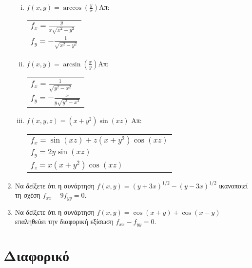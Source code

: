 \documentclass[a4paper,table]{report}
\begin{document}
\begin{enumerate}
\begin{enumerate}[i)]
      \item $f(x,y)=\arccos(\frac{y}{x})$\hfill Απ: \begin{tabular}{l}
          $f_x=\frac{y}{x\sqrt{x^2-y^2}}$ \\ 
          $f_y=-\frac{1}{\sqrt{x^2-y^2}}$
        \end{tabular}

      \item $f(x,y)=\arcsin(\frac{x}{y})$\hfill Απ: \begin{tabular}{l}
          $f_x=\frac{1}{\sqrt{y^2-x^2}}$ \\ 
          $f_y=-\frac{x}{y\sqrt{y^2-x^2}}$
        \end{tabular}

      \item $ f(x,y,z) = (x+y^{2}) \sin{(xz)} $ \hfill Απ: \begin{tabular}{l}
          $ f_{x} = \sin{(xz)} + z(x+y^{2}) \cos{(xz)} $ \\
          $ f_{y} = 2y \sin{(xz)} $ \\
          $ f_{z} = x(x+y^{2}) \cos{(xz)} $
        \end{tabular} 
    \end{enumerate}

  \item Να δείξετε ότι η συνάρτηση $ f(x,y) = (y+3x)^{1/2} - 
    (y-3x)^{1/2} $ ικανοποιεί τη σχέση $ f_{xx} - 9 f_{yy} = 0 $.
  \item Να δείξετε ότι η συνάρτηση $ f(x,y) = \cos{(x+y)} + \cos{(x-y)} $ 
    επαληθεύει την διαφορική εξίσωση $ f_{xx} - f_{yy} = 0 $.
\end{enumerate}


\section*{Διαφορικό}
\end{document}
